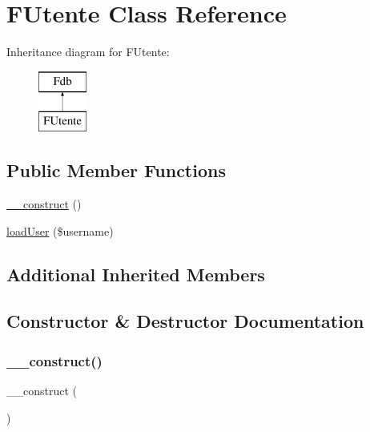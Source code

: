 \hypertarget{class_f_utente}{}\section{F\+Utente Class Reference}
\label{class_f_utente}
Inheritance diagram for F\+Utente\+:\begin{figure}[H]
\begin{center}
\leavevmode
\includegraphics[height=2.000000cm]{class_f_utente}
\end{center}
\end{figure}
\subsection*{Public Member Functions}
\begin{DoxyCompactItemize}
\item 
\mbox{\hyperlink{class_f_utente_a095c5d389db211932136b53f25f39685}{\+\_\+\+\_\+construct}} ()
\item 
\mbox{\hyperlink{class_f_utente_a181f021166bb2b25b468928a8e21df0a}{load\+User}} (\$username)
\end{DoxyCompactItemize}
\subsection*{Additional Inherited Members}


\subsection{Constructor \& Destructor Documentation}
\mbox{\label{class_f_utente_a095c5d389db211932136b53f25f39685}} 
\subsubsection{\texorpdfstring{\+\_\+\+\_\+construct()}{\_\_construct()}}
{\footnotesize\ttfamily \+\_\+\+\_\+construct (\begin{DoxyParamCaption}{ }\end{DoxyParamCaption})}

